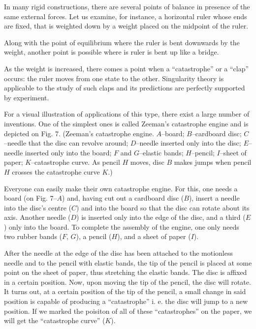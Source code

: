 \documentclass[12pt]{amsart}
\begin{document}
In many rigid constructions, there are several points of balance in presence of
the same external forces.
Let us examine, for instance, a horizontal ruler whose ends are fixed, that is
weighted down by a weight placed on the midpoint of the ruler.

Along with the point of equilibrium where the ruler is bent downwards by the weight,
another point is possible where is ruler is bent up like a bridge.

As the weight is increased, there comes a point when a ``catastrophe'' or a
``clap'' occurs: the ruler moves from one state to the other.
Singularity theory is applicable to the study of such claps and its predictions
are perfectly supported by experiment.

For a visual illustration of applications of this type, there exist a large
number of inventions.
One of the simplest ones is called Zeeman's catastrophe engine and is depicted
on Fig. 7.
(Zeeman's catastrophe engine.
$A$--board; $B$--cardboard disc; $C$--needle that the disc can revolve around;
$D$--needle inserted only into the disc; $E$--needle inserted only into the
board; $F$ and $G$--elastic bands; $H$--pencil; $I$--sheet of paper;
$K$--catastrophe curve.
As pencil $H$ moves, disc $B$ makes jumps when pencil $H$ crosses the
catastrophe curve $K$.)

Everyone can easily make their own catastrophe engine.
For this, one needs a board (on Fig. 7--$A$) and, having cut out a cardboard
disc ($B$), insert a needle into the disc's centre ($C$) and into the board so
that the disc can rotate about its axis.
Another needle ($D$) is inserted only into the edge of the disc, and a third
($E$) only into the board.
To complete the assembly of the engine, one only needs two rubber bands ($F$,
$G$), a pencil ($H$), and a sheet of paper ($I$).

After the needle at the edge of the disc has been attached to the motionless
needle and to the pencil with elastic bands, the tip of the pencil is placed at
some point on the sheet of paper, thus stretching the elastic bands.
The disc is affixed in a certain position.
Now, upon moving the tip of the pencil, the disc will rotate.
It turns out, at a certain position of the tip of the pencil, a small change in
said position is capable of producing a ``catastrophe'' i. e. the disc will jump
to a new position.
If we marked the poisiton of all of these ``catastrophes'' on the paper, we will
get the ``catastrophe curve'' ($K$).
\end{document}
